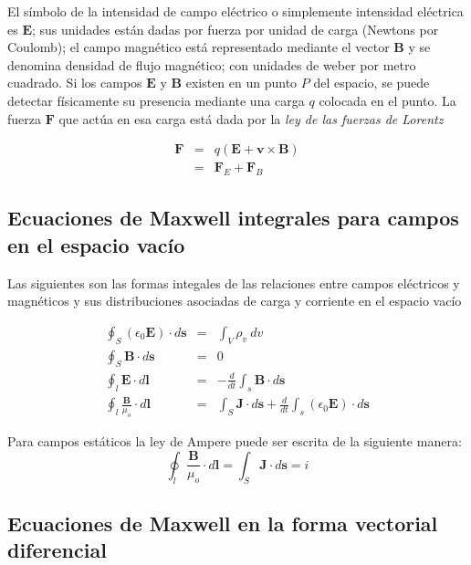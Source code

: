 El símbolo de la intensidad de campo eléctrico o simplemente intensidad eléctrica es $\mathbf{E}$; sus unidades están dadas por fuerza por unidad de carga (Newtons por Coulomb); el campo magnético está representado mediante el vector $\mathbf{B}$ y se denomina densidad de flujo magnético; con unidades de weber por metro cuadrado. Si los campos $\mathbf{E}$ y $\mathbf{B}$ existen en un punto $P$ del espacio, se puede detectar físicamente su presencia mediante una carga $q$ colocada en el punto. La fuerza $\mathbf{F}$ que actúa en esa carga está dada por la \textit{ley de las fuerzas de Lorentz}

\begin{eqnarray*}
\mathbf{F} &=& q(\mathbf{E} + \mathbf{v} \times \mathbf{B}) \\
&=& \mathbf{F}_E + \mathbf{F}_B
\end{eqnarray*}

\subsection{Ecuaciones de Maxwell integrales para campos en el espacio vacío}

Las siguientes son las formas integales de las relaciones entre campos eléctricos y magnéticos y sus distribuciones asociadas de carga y corriente en el espacio vacío

\begin{eqnarray*}
\oint_S (\epsilon_0 \mathbf{E}) \cdot d \mathbf{s} &=& \int_V \rho_v \ dv \\
\oint_S \mathbf{B} \cdot d \mathbf{s} &=& 0 \\
\oint_l \mathbf{E} \cdot d \mathbf{l} &=& - \frac{d}{dt} \int_s \mathbf{B} \cdot d \mathbf{s} \\
\oint_l \frac{\mathbf{B}}{\mu_o} \cdot d \mathbf{l} &=& \int_S \mathbf{J} \cdot d \mathbf{s} + \frac{d}{dt} \int_s (\epsilon_0 \mathbf{E}) \cdot d \mathbf{s}
\end{eqnarray*}

Para campos estáticos la ley de Ampere puede ser escrita de la siguiente manera:
\begin{equation*}
\oint_l \frac{\mathbf{B}}{\mu_o} \cdot d \mathbf{l} = \int_S \mathbf{J} \cdot d \mathbf{s} = i
\end{equation*}


\subsection{Ecuaciones de Maxwell en la forma vectorial diferencial}

